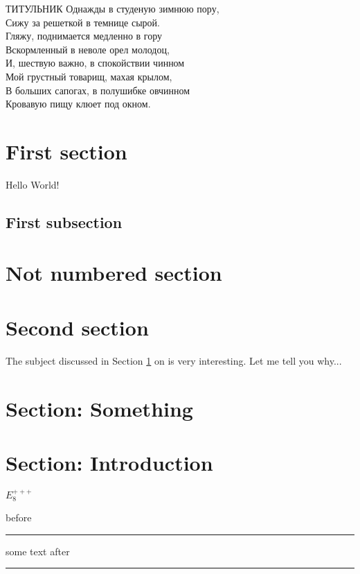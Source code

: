 \documentclass [a4paper,oneside,final,14pt]{extarticle}
\begin{document}
ТИТУЛЬНИК
\bigskip
\noindent Однажды в студеную зимнюю пору, \\
Сижу за решеткой в темнице сырой.\\
Гляжу, поднимается медленно в гору\\
Вскормленный в неволе орел молодоц,\\
И, шествую важно, в спокойствии чинном\\
Мой грустный товарищ, махая крылом,\\
В больших сапогах, в полушибке овчинном\\
Кровавую пищу клюет под окном.
\bigskip

\tableofcontents
\section{First section} \label{first_section}
Hello World!
\subsection{First subsection}
\section*{Not numbered section}
\section{Second section}
The subject discussed in Section \ref{first_section} on \pageref{first_section} is very interesting. Let me tell you why...
\newcommand {\E}[0]{$E_8^{+++}$}
\newcommand {\seclab}[1]{\section{Section: #1}}
\seclab {Something}
\seclab {Introduction}
\let\oldsection\section
\renewcommand {\section}[1]{\centerline{Section: #1}}

\def \E {$E_8^{+++}$}
\E

\newenvironment{ruled}[0]{before\hrule}{after\hrule}


\begin{ruled}
some text	
\end{ruled}
\end{document}
